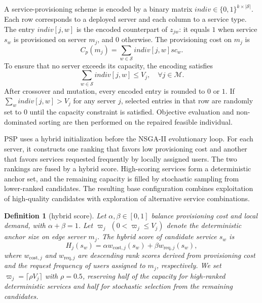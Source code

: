 \documentclass[10pt, conference, letterpaper]{IEEEtran}
\newenvironment{revision}{\begingroup\color{blue}}{\endgroup}
\newenvironment{revision}{\begingroup}{\endgroup}
\newtheorem{definition}{\textbf{Definition}}
\begin{document}
\begin{revision}
A service-provisioning scheme is encoded by a binary matrix $\textit{indiv}\in\{0,1\}^{k\times|\mathcal{S}|}$. Each row corresponds to a deployed server and each column to a service type. The entry $\textit{indiv}[j,w]$ is the encoded counterpart of $z_{jw}$: it equals $1$ when service $s_w$ is provisioned on server $m_j$, and $0$ otherwise. The provisioning cost on $m_j$ is
\begin{equation}
C_{p}(m_j)=\sum_{w\in\mathcal{S}}\textit{indiv}[j,w]sc_w.
\end{equation}
To ensure that no server exceeds its capacity, the encoding satisfies
\begin{equation}
\sum_{w \in \mathcal{S}} \textit{indiv}[j, w] \leq V_j, \quad \forall j \in \mathcal{M}.
\end{equation}
\end{revision}
\begin{revision}
After crossover and mutation, every encoded entry is rounded to $0$ or $1$. If $\sum_w \textit{indiv}[j,w]>V_j$ for any server $j$, selected entries in that row are randomly set to $0$ until the capacity constraint is satisfied. Objective evaluation and non-dominated sorting are then performed on the repaired feasible individual.
\end{revision}

\begin{revision}
PSP uses a hybrid initialization before the NSGA-II evolutionary loop. For each server, it constructs one ranking that favors low provisioning cost and another that favors services requested frequently by locally assigned users. The two rankings are fused by a hybrid score. High-scoring services form a deterministic anchor set, and the remaining capacity is filled by stochastic sampling from lower-ranked candidates. The resulting base configuration combines exploitation of high-quality candidates with exploration of alternative service combinations.
\end{revision}
\begin{revision}
\begin{definition}[hybrid score]\label{def:init_pop}
Let $\alpha,\beta\in[0,1]$ balance provisioning cost and local demand, with $\alpha+\beta=1$. Let $\varpi_j$ $(0<\varpi_j\leq V_j)$ denote the deterministic anchor size on edge server $m_j$. The hybrid score of candidate service $s_w$ is
\begin{equation}
H_j(s_w)=\alpha w_{\mathrm{cost},j}(s_w)+\beta w_{\mathrm{req},j}(s_w),
\label{eq:hybrid_score}
\end{equation}
where $w_{\mathrm{cost},j}$ and $w_{\mathrm{req},j}$ are descending rank scores derived from provisioning cost and the request frequency of users assigned to $m_j$, respectively. We set $\varpi_j=\lceil\rho V_j\rceil$ with $\rho=0.5$, reserving half of the capacity for high-ranked deterministic services and half for stochastic selection from the remaining candidates.
\end{definition}
\end{revision}
\end{document}
